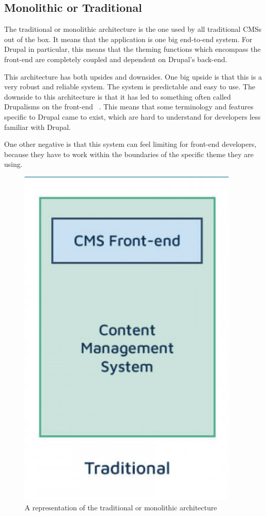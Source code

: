 \subsection{Monolithic or Traditional}
The traditional or monolithic architecture is the one used by all traditional CMSs out of the box. It means that the application is one big end-to-end system. For Drupal in particular, this means that the theming functions which encompass the front-end are completely coupled and dependent on Drupal's back-end.

This architecture has both upsides and downsides. One big upside is that this is a very robust and reliable system. The system is predictable and easy to use. The downside to this architecture is that it has led to something often called Drupalisms on the front-end ~\autocite{So2018}. This means that some terminology and features specific to Drupal came to exist, which are hard to understand for developers less familiar with Drupal. 

One other negative is that this system can feel limiting for front-end developers, because they have to work within the boundaries of the specific theme they are using.

\begin{figure}
\centering
\includegraphics{./img/Traditional_Architecture}
\caption[Traditional CMS architecture]{A representation of the traditional or monolithic architecture ~\autocite{Dropsolid2021}}
\end{figure}

